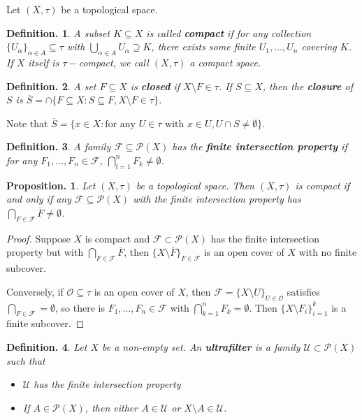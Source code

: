 \documentclass[11pt, a4paper]{memoir}
\theoremstyle{change}
\newtheorem{proposition}[theorem]{Proposition.}
\theoremstyle{plain}
\theoremstyle{nonumberplain}
\newtheorem{definition}{Definition.}
\newtheorem{proof}{Proof}
\numberwithin{equation}{section}
\begin{document}
Let $(X,\tau)$ be a topological space.
\begin{definition}
    A subset $K\subseteq X$ is called \textbf{compact} if for any collection $\{U_\alpha\}_{\alpha\in A}\subseteq\tau$ with $\bigcup_{\alpha\in A}U_\alpha\supseteq K$, there exists some finite $U_1,\ldots,U_n$ covering $K$.
    If $X$ itself is $\tau-$compact, we call $(X,\tau)$ a compact space.
\end{definition}
\begin{definition}
    A set $F\subseteq X$ is \textbf{closed} if $X\setminus F\in\tau$.
    If $S\subseteq X$, then the \textbf{closure} of $S$ is $\overline{S}=\cap\{F\subseteq X:S\subseteq F,X\setminus F\in\tau\}$.
\end{definition}
Note that $\overline{S}=\{x\in X:\text{for any }U\in\tau\text{ with }x\in U,U\cap S\neq\emptyset\}$.
\begin{definition}
    A family $\mathcal{F}\subseteq\mathcal{P}(X)$ has the \textbf{finite intersection property} if for any $F_1,\ldots,F_n\in\mathcal{F}$, $\bigcap_{l=1}^n F_k\neq\emptyset$.
\end{definition}
\begin{proposition}
    Let $(X,\tau)$ be a topological space.
    Then $(X,\tau)$ is compact if and only if any $\mathcal{F}\subseteq\mathcal{P}(X)$ with the finite intersection property has $\bigcap_{F\in\mathcal{F}}\overline{F}\neq\emptyset$.
\end{proposition}
\begin{proof}
    Suppose $X$ is compact and $\mathcal{F}\subset\mathcal{P}(X)$ has the finite intersection property but with $\bigcap_{F\in\mathcal{F}}\overline{F}$, then $\{X\setminus\overline{F}\}_{F\in\mathcal{F}}$ is an open cover of $X$ with no finite subcover.

    Conversely, if $\mathcal{O}\subseteq\tau$ is an open cover of $X$, then $\mathcal{F}=\{X\setminus U\}_{U\in\mathcal{O}}$ satisfies $\bigcap_{F\in\mathcal{F}}=\emptyset$, so there is $F_1,\ldots,F_n\in\mathcal{F}$ with $\bigcap_{k=1}^n F_k=\emptyset$.
    Then $\{X\setminus F_i\}_{i=1}^k$ is a finite subcover.
\end{proof}
\begin{definition}
    Let $X$ be a non-empty set.
    An \textbf{ultrafilter} is a family $\mathcal{U}\subset\mathcal{P}(X)$ such that
    \begin{itemize}[nl]
        \item $\mathcal{U}$ has the finite intersection property
        \item If $A\in\mathcal{P}(X)$, then either $A\in\mathcal{U}$ or $X\setminus A\in\mathcal{U}$.
    \end{itemize}
\end{definition}
\end{document}
